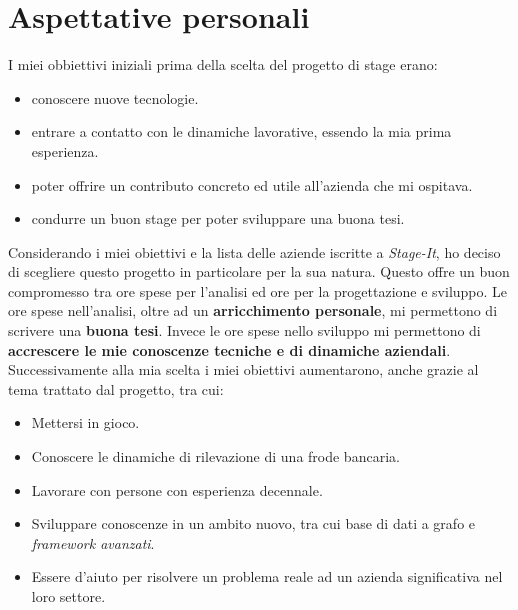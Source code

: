 \section{Aspettative personali}
I miei obbiettivi iniziali prima della scelta del progetto di stage erano:
\begin{itemize}
\item conoscere nuove tecnologie.
\item entrare a contatto con le dinamiche lavorative, essendo la mia prima esperienza.
\item poter offrire un contributo concreto ed utile all'azienda che mi ospitava.
\item condurre un buon stage per poter sviluppare una buona tesi.
\end{itemize}
Considerando i miei obiettivi e la lista delle aziende iscritte a \textit{Stage-It}, ho deciso di scegliere questo progetto in particolare per la sua natura. Questo offre un buon compromesso tra ore spese per l'analisi ed ore per la progettazione e sviluppo. Le ore spese nell'analisi, oltre ad un \textbf{arricchimento personale}, mi permettono di scrivere una \textbf{buona tesi}. Invece le ore spese nello sviluppo mi permettono di \textbf{accrescere le mie conoscenze tecniche e di dinamiche aziendali}. \\
Successivamente alla mia scelta i miei obiettivi aumentarono, anche grazie al tema trattato dal progetto, tra cui:
\begin{itemize}
\item Mettersi in gioco.
\item Conoscere le dinamiche di rilevazione di una frode bancaria.
\item Lavorare con persone con esperienza decennale.
\item Sviluppare conoscenze in un ambito nuovo, tra cui base di dati a grafo e \textit{framework avanzati}.
\item Essere d'aiuto per risolvere un problema reale ad un azienda significativa nel loro settore.
\end{itemize}






